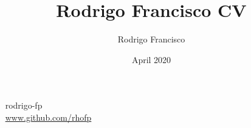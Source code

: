 \documentclass[blue]{pastelcv}              %
\begin{document}
\title{Rodrigo Francisco CV}
\author{Rodrigo Francisco}
\date{April 2020}

\graphicspath{{assets/}}

\thispagestyle{empty}

\begin{center}
 
  \getgreyishblackfont
  {
    \small 
  \faLinkedin~ rodrigo-fp\\[2mm]
  \faGithub~ \protect\url{www.github.com/rhofp}
  }

\end{center}

\vspace{3mm}


\end{document}
